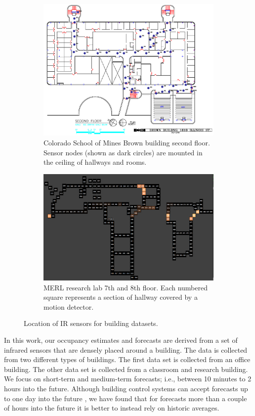 \documentclass{acm_proc_article-sp}
\begin{document}
\begin{figure}[t]
\centering
\begin{subfigure}{.45\textwidth}
  \centering
  \includegraphics[width=.8\linewidth]{bb_floor2_sensors_old.png}
  \caption{Colorado School of Mines Brown building second floor.  Sensor nodes (shown as dark circles) are mounted in the ceiling of hallways and rooms.}
  \label{fig:csmbbfloor}
\end{subfigure}
\begin{subfigure}{.45\textwidth}
  \centering
  \includegraphics[width=.8\linewidth]{merl_map.png}
  \caption{MERL research lab 7th and 8th floor.  Each numbered square represents a section of hallway covered by a motion detector.}
  \label{fig:merlfloor}
\end{subfigure}
\caption{Location of IR sensors for building datasets.}
\label{fig:test}
\end{figure}

In this work, our occupancy estimates and forecasts are derived from a set of infrared sensors that are densely placed around a building.  The data is collected from two different types of buildings.  The first data set is collected from an office building.  The other data set is collected from a classroom and research building.  We focus on short-term and medium-term forecasts; i.e., between 10 minutes to 2 hours into the future.  Although building control systems can accept forecasts up to one day into the future \cite{Ma2010}, we have found that for forecasts more than a couple of hours into the future it is better to instead rely on historic averages.  
\end{document}
